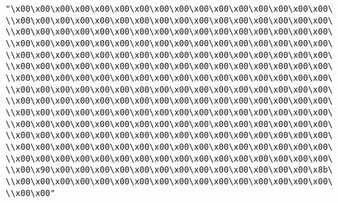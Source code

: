 \verb|"\x00\x00\x00\x00\x00\x00\x00\x00\x00\x00\x00\x00\x00\x00\x00\x00\|\newline
\verb|\\x00\x00\x00\x00\x00\x00\x00\x00\x00\x00\x00\x00\x00\x00\x00\x00\|\newline
\verb|\\x00\x00\x00\x00\x00\x00\x00\x00\x00\x00\x00\x00\x00\x00\x00\x00\|\newline
\verb|\\x00\x00\x00\x00\x00\x00\x00\x00\x00\x00\x00\x00\x00\x00\x00\x00\|\newline
\verb|\\x00\x00\x00\x00\x00\x00\x00\x00\x00\x00\x00\x00\x00\x00\x00\x00\|\newline
\verb|\\x00\x00\x00\x00\x00\x00\x00\x00\x00\x00\x00\x00\x00\x00\x00\x00\|\newline
\verb|\\x00\x00\x00\x00\x00\x00\x00\x00\x00\x00\x00\x00\x00\x00\x00\x00\|\newline
\verb|\\x00\x00\x00\x00\x00\x00\x00\x00\x00\x00\x00\x00\x00\x00\x00\x00\|\newline
\verb|\\x00\x00\x00\x00\x00\x00\x00\x00\x00\x00\x00\x00\x00\x00\x00\x00\|\newline
\verb|\\x00\x00\x00\x00\x00\x00\x00\x00\x00\x00\x00\x00\x00\x00\x00\x00\|\newline
\verb|\\x00\x00\x00\x00\x00\x00\x00\x00\x00\x00\x00\x00\x00\x00\x00\x00\|\newline
\verb|\\x00\x00\x00\x00\x00\x00\x00\x00\x00\x00\x00\x00\x00\x00\x00\x00\|\newline
\verb|\\x00\x00\x00\x00\x00\x00\x00\x00\x00\x00\x00\x00\x00\x00\x00\x00\|\newline
\verb|\\x00\x00\x00\x00\x00\x00\x00\x00\x00\x00\x00\x00\x00\x00\x00\x00\|\newline
\verb|\\x00\x90\x00\x00\x00\x00\x00\x00\x00\x00\x00\x00\x00\x00\x00\x8b\|\newline
\verb|\\x00\x00\x00\x00\x00\x00\x00\x00\x00\x00\x00\x00\x00\x00\x00\x00\|\newline
\verb|\\x00\x00"|\newline
